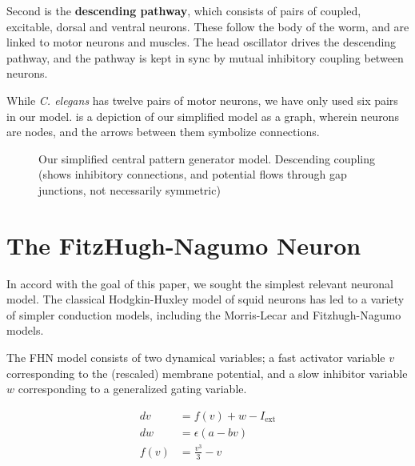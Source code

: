\documentclass[
    11pt,
]{article}
\begin{document}
Second is the \textbf{descending pathway}, which consists of pairs of coupled, excitable, dorsal and ventral neurons.  These follow the body of the worm, and are linked to motor neurons and muscles.  The head oscillator drives the descending pathway, and the pathway is kept in sync by mutual inhibitory coupling between neurons.


While \textit{C. elegans} has twelve pairs of motor neurons, we have only used six pairs in our model.   is a depiction of our simplified model as a graph, wherein neurons are nodes, and the arrows between them symbolize connections.

\begin{figure}[h!]
    \label{fig: cpg}
    \centering
    \caption{Our simplified central pattern generator model.  Descending coupling (shows inhibitory connections, and potential flows through gap junctions, not necessarily symmetric)}
\end{figure} %

\section{The FitzHugh-Nagumo Neuron}\label{sec: fhn}

In accord with the goal of this paper, we sought the simplest relevant neuronal model.  The classical Hodgkin-Huxley\cite{hodgkin1952} model of squid neurons has led to a variety of simpler conduction models, including the Morris-Lecar\cite{morris1981} and Fitzhugh-Nagumo models.

The FHN model consists of two dynamical variables; a fast activator variable $v$ corresponding to the (rescaled) membrane potential, and a slow inhibitor variable $w$ corresponding to a generalized gating variable.

\begin{equation} %
    \label{eq: fhn}
    \begin{aligned}
        dv &= f(v) + w - I_\mathrm{ext}\\
        dw &= ϵ(a - bv)\\
        f(v) &= \frac{v^3}{3} - v
    \end{aligned}
\end{equation}
\end{document}
